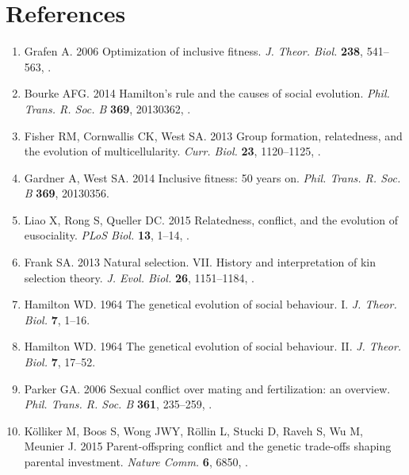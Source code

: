 \documentclass[12pt]{article}
\begin{document}
\section*{References}
\begin{enumerate}

\item{Grafen A. 2006 {Optimization of inclusive fitness}. \textit{J. Theor. Biol.}
  \textbf{238}, 541--563,
  .}

\item{Bourke AFG. 2014 {Hamilton's rule and the causes of social evolution}.
  \textit{Phil. Trans. R. Soc. B} \textbf{369},
  20130362, .}

\item{Fisher RM, Cornwallis CK, West SA. 2013 {Group formation,
  relatedness, and the evolution of multicellularity}. \textit{Curr. Biol.}
  \textbf{23}, 1120--1125, 
  .}

\item{Gardner A, West SA. 2014 {Inclusive fitness: 50 years on}.
  \textit{Phil. Trans. R. Soc. B} \textbf{369}, 20130356.}

\item{Liao X, Rong S, Queller DC. 2015 {Relatedness, conflict, and the
  evolution of eusociality}. \textit{PLoS Biol.} \textbf{13}, 1--14,
  .}

\item{Frank SA. 2013 {Natural selection. VII. History and interpretation of kin
  selection theory}. \textit{J. Evol. Biol.} \textbf{26},
  1151--1184, .}

\item{Hamilton WD. 1964 {The genetical evolution of social behaviour. I}.
  \textit{J. Theor. Biol.} \textbf{7}, 1--16.}

\item{Hamilton WD. 1964 {The genetical evolution of social behaviour. II}.
  \textit{J. Theor. Biol.} \textbf{7}, 17--52.}

\item{Parker GA. 2006 {Sexual conflict over mating and fertilization: an
  overview}. \textit{Phil. Trans. R. Soc. B}
  \textbf{361}, 235--259, .}

\item{K{\"{o}}lliker M, Boos S, Wong JWY, R{\"{o}}llin L, Stucki D,
  Raveh S, Wu M, Meunier J. 2015 {Parent-offspring conflict and the
  genetic trade-offs shaping parental investment}. \textit{Nature Comm.} 
  \textbf{6}, 6850, .}


\end{enumerate}
\end{document}
